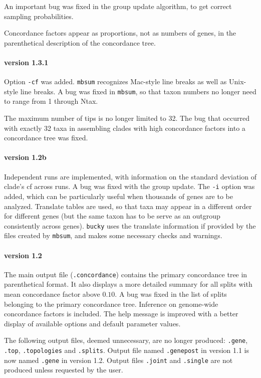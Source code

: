 \documentclass[12pt,english,final,letterpaper]{article}
\newcommand{\cf}{concordance factor}
\begin{document}
\smallskip
An important bug was fixed in the group update algorithm, to get correct
sampling probabilities.

\smallskip Concordance factors appear as proportions, not as numbers of genes,
in the parenthetical description of the concordance tree.

\paragraph{version 1.3.1}
Option {\tt -cf} was added.
{\tt mbsum} recognizes Mac-style line breaks as well as
Unix-style line breaks. A bug was fixed in {\tt mbsum}, 
so that taxon numbers no longer need to range from 1 through Ntax.

\smallskip The maximum number of tips is no longer limited to 32.
The bug that occurred with exactly 32 taxa in assembling clades with 
high \cf{}s into a concordance tree was fixed.

\paragraph{version 1.2b}
Independent runs are implemented, with information on the standard deviation
of clade's {\sc cf} across runs. A bug was fixed with the group update.
The {\tt -i} option was added, which can be particularly useful when
thousands of genes are to be analyzed. Translate tables are used,
so that taxa may appear in a different order for different genes (but the 
same taxon has to be serve as an outgroup consistently across genes).
{\tt bucky} uses the translate information if provided 
by the files created by {\tt mbsum}, and makes some necessary checks and
warnings.

\paragraph{version 1.2}
The main output file ({\tt .concordance}) contains the primary concordance
tree in parenthetical format. It also displays a more detailed summary
for all splits with mean concordance factor above $0.10$. 
A bug was fixed in the list of splits belonging to the
primary concordance tree. Inference on genome-wide concordance factors is
included.
The help message is improved with a better display of available options and
default parameter values.

\smallskip

The following output files, deemed unnecessary, are no longer produced:
{\tt .gene}, {\tt .top}, {\tt .topologies} and {\tt .splits}. 
Output file named {\tt .genepost} in version 1.1 is now named 
{\tt .gene} in version 1.2. 
Output files {\tt .joint} and {\tt .single} are not produced unless
requested by the user.
\end{document}
